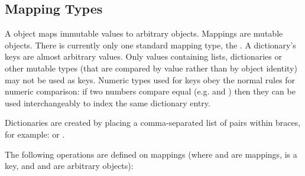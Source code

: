 \subsection{Mapping Types \label{typesmapping}}

A  object maps  immutable values to
arbitrary objects.  Mappings are mutable objects.  There is currently
only one standard mapping type, the .  A dictionary's keys are
almost arbitrary values.  Only values containing lists, dictionaries
or other mutable types (that are compared by value rather than by
object identity) may not be used as keys.
Numeric types used for keys obey the normal rules for numeric
comparison: if two numbers compare equal (e.g.  and
) then they can be used interchangeably to index the same
dictionary entry.

Dictionaries are created by placing a comma-separated list of
 pairs within braces, for example:
 or
.

The following operations are defined on mappings (where  and
 are mappings,  is a key, and  and  are
arbitrary objects):


